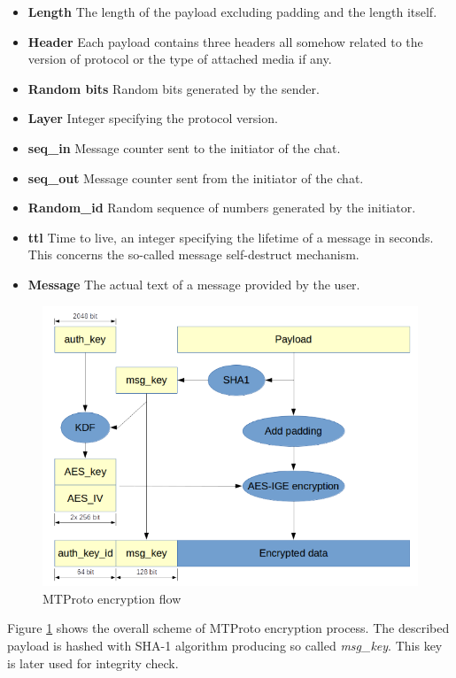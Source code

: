 \documentclass[thesis=M,english]{FITthesis}[2012/10/20]
\begin{document}
\begin{itemize}
	\item  \textbf{Length} The length of the payload excluding padding and the length itself.
	\item  \textbf{Header} Each payload contains three headers all somehow related to the version of protocol or the type of attached media if any.
	\item  \textbf{Random bits} Random bits generated by the sender.
	\item  \textbf{Layer} Integer specifying the protocol version.
	\item  \textbf{seq\_in} Message counter sent to the initiator of the chat.
	\item  \textbf{seq\_out} Message counter sent from the initiator of the chat.
	\item  \textbf{Random\_id} Random sequence of numbers generated by the initiator.
	\item  \textbf{ttl} Time to live, an integer specifying the lifetime of a message in seconds. This concerns the so-called message self-destruct mechanism.
	\item  \textbf{Message} The actual text of a message provided by the user.
\end{itemize}


\begin{figure}[htb]
	\centering
	\includegraphics[width=1\textwidth]{telegram-encflow-ed.png}
	\caption{MTProto encryption flow \cite{telegram-aarhus}}
	\label{img:telegram-encflow}
\end{figure}


Figure \ref{img:telegram-encflow} shows the overall scheme of MTProto encryption process. The described payload is hashed with SHA-1 algorithm producing so called \emph{msg\_key}. This key is later used for integrity check.
\end{document}
